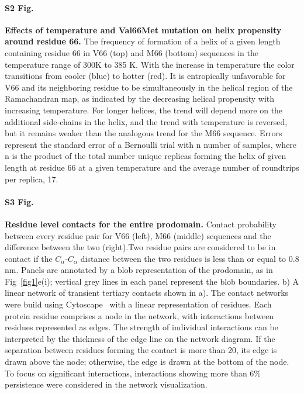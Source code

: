 \documentclass[10pt,letterpaper]{article}
\begin{document}
\paragraph*{S2 Fig.}
\label{S2_Fig}
{\bf Effects of temperature and Val66Met mutation on helix propensity around residue 66.} 
The frequency of formation of a helix of a given length containing residue 66 in V66 (top) and M66 (bottom) sequences in the temperature range of 300K to 385 K. With the increase in temperature the color transitions from cooler (blue) to hotter (red). It is entropically unfavorable for V66 and its neighboring residue to be simultaneously in the helical region of the Ramachandran map, as indicated by the decreasing helical propensity with increasing temperature. For longer helices, the trend will depend more on the additional side-chains in the helix, and the trend with temperature is reversed, but it remains weaker than the analogous trend for the M66 sequence. Errors represent the standard error of a Bernoulli trial with n number of samples, where n is the product of the total number unique replicas forming the helix of given length at residue 66 at a given temperature and the average number of roundtrips per replica, 17.

\paragraph*{S3 Fig.}
\label{S3_Fig}
{\bf Residue level contacts for the entire prodomain.}
Contact probability between every residue pair for V66 (left), M66 (middle) sequences and the difference between the two (right).Two residue pairs are considered to be in contact if the $C_{\alpha}$-$C_{\alpha}$ distance between the two residues is less than or equal to 0.8 nm. Panels are annotated by a blob representation of the prodomain, as in Fig~\ref{fig1}e(i); vertical grey lines in each panel represent the blob boundaries. b) A linear network of transient tertiary contacts shown in a). The contact networks were build using Cytoscape~\cite{Ahlstrom2013} with a linear representation of residues. Each protein residue comprises a node in the network, with interactions between residues represented as edges. The strength of individual interactions can be interpreted by the thickness of the edge line on the network diagram. If the separation between residues forming the contact is more than 20, its edge is drawn above the node; otherwise, the edge is drawn at the bottom of the node. To focus on significant interactions, interactions showing more than 6\% persistence were considered in the network visualization. 
\end{document}
